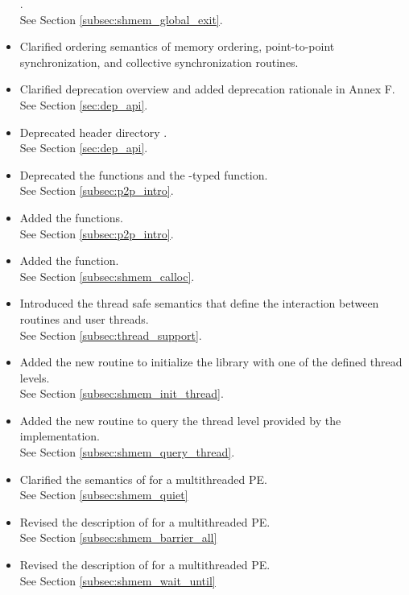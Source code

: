 \begin{itemize}
.
\\ See Section \ref{subsec:shmem_global_exit}.
%
\item Clarified ordering semantics of memory ordering, point-to-point synchronization, and collective
synchronization routines.
%
\item Clarified deprecation overview and added deprecation rationale in Annex F.
\\See Section \ref{sec:dep_api}.
%
\item Deprecated header directory .
\\See Section \ref{sec:dep_api}.
%
\item Deprecated the  functions and the -typed \CorCpp {} function.
\\ See Section \ref{subsec:p2p_intro}.
%
\item Added the  functions.
\\ See Section \ref{subsec:p2p_intro}.
%
\item Added the  function.
\\ See Section \ref{subsec:shmem_calloc}.
%
\item Introduced the thread safe semantics that define the interaction between
    \openshmem routines and user threads.
\\See Section \ref{subsec:thread_support}.
%
\item Added the new routine  to initialize the
    \openshmem library with one of the defined thread levels.
\\See Section \ref{subsec:shmem_init_thread}.
%
\item Added the new routine  to query the thread
    level provided by the \openshmem implementation.
\\See Section \ref{subsec:shmem_query_thread}.
%
\item Clarified the semantics of  for a multithreaded
    \openshmem \ac{PE}.
\\See Section \ref{subsec:shmem_quiet}
%
\item Revised the description of  for a multithreaded
    \openshmem \ac{PE}.
\\See Section \ref{subsec:shmem_barrier_all}
%
\item Revised the description of  for a multithreaded
    \openshmem \ac{PE}.
\\See Section \ref{subsec:shmem_wait_until}

\end{itemize}
